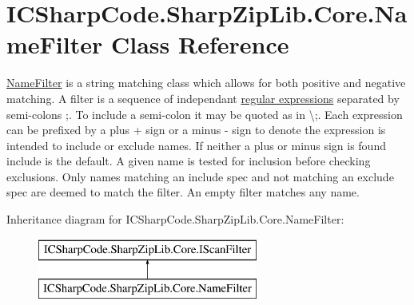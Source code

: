 \hypertarget{class_i_c_sharp_code_1_1_sharp_zip_lib_1_1_core_1_1_name_filter}{}\section{I\+C\+Sharp\+Code.\+Sharp\+Zip\+Lib.\+Core.\+Name\+Filter Class Reference}
\label{class_i_c_sharp_code_1_1_sharp_zip_lib_1_1_core_1_1_name_filter}


\hyperlink{class_i_c_sharp_code_1_1_sharp_zip_lib_1_1_core_1_1_name_filter}{Name\+Filter} is a string matching class which allows for both positive and negative matching. A filter is a sequence of independant \hyperlink{}{regular expressions} separated by semi-\/colons \textquotesingle{};\textquotesingle{}. To include a semi-\/colon it may be quoted as in \textbackslash{};. Each expression can be prefixed by a plus \textquotesingle{}+\textquotesingle{} sign or a minus \textquotesingle{}-\/\textquotesingle{} sign to denote the expression is intended to include or exclude names. If neither a plus or minus sign is found include is the default. A given name is tested for inclusion before checking exclusions. Only names matching an include spec and not matching an exclude spec are deemed to match the filter. An empty filter matches any name.  


Inheritance diagram for I\+C\+Sharp\+Code.\+Sharp\+Zip\+Lib.\+Core.\+Name\+Filter\+:\begin{figure}[H]
\begin{center}
\leavevmode
\includegraphics[height=2.000000cm]{class_i_c_sharp_code_1_1_sharp_zip_lib_1_1_core_1_1_name_filter}
\end{center}
\end{figure}
